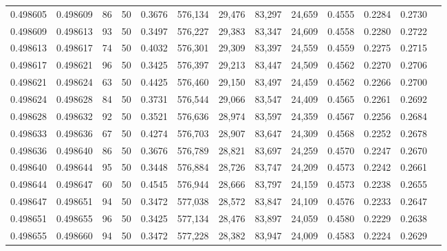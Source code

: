 \begin{tabular}{rrrrrrrrrrrrr}
0.498605 & 0.498609 &    86 &  50 &                                     0.3676 & 576,134 &  29,476 &  83,297 &  24,659 & 0.4555 & 0.2284 & 0.2730 \\
0.498609 & 0.498613 &    93 &  50 &                                     0.3497 & 576,227 &  29,383 &  83,347 &  24,609 & 0.4558 & 0.2280 & 0.2722 \\
0.498613 & 0.498617 &    74 &  50 &                                     0.4032 & 576,301 &  29,309 &  83,397 &  24,559 & 0.4559 & 0.2275 & 0.2715 \\
0.498617 & 0.498621 &    96 &  50 &                                     0.3425 & 576,397 &  29,213 &  83,447 &  24,509 & 0.4562 & 0.2270 & 0.2706 \\
0.498621 & 0.498624 &    63 &  50 &                                     0.4425 & 576,460 &  29,150 &  83,497 &  24,459 & 0.4562 & 0.2266 & 0.2700 \\
0.498624 & 0.498628 &    84 &  50 &                                     0.3731 & 576,544 &  29,066 &  83,547 &  24,409 & 0.4565 & 0.2261 & 0.2692 \\
0.498628 & 0.498632 &    92 &  50 &                                     0.3521 & 576,636 &  28,974 &  83,597 &  24,359 & 0.4567 & 0.2256 & 0.2684 \\
0.498633 & 0.498636 &    67 &  50 &                                     0.4274 & 576,703 &  28,907 &  83,647 &  24,309 & 0.4568 & 0.2252 & 0.2678 \\
0.498636 & 0.498640 &    86 &  50 &                                     0.3676 & 576,789 &  28,821 &  83,697 &  24,259 & 0.4570 & 0.2247 & 0.2670 \\
0.498640 & 0.498644 &    95 &  50 &                                     0.3448 & 576,884 &  28,726 &  83,747 &  24,209 & 0.4573 & 0.2242 & 0.2661 \\
0.498644 & 0.498647 &    60 &  50 &                                     0.4545 & 576,944 &  28,666 &  83,797 &  24,159 & 0.4573 & 0.2238 & 0.2655 \\
0.498647 & 0.498651 &    94 &  50 &                                     0.3472 & 577,038 &  28,572 &  83,847 &  24,109 & 0.4576 & 0.2233 & 0.2647 \\
0.498651 & 0.498655 &    96 &  50 &                                     0.3425 & 577,134 &  28,476 &  83,897 &  24,059 & 0.4580 & 0.2229 & 0.2638 \\
0.498655 & 0.498660 &    94 &  50 &                                     0.3472 & 577,228 &  28,382 &  83,947 &  24,009 & 0.4583 & 0.2224 & 0.2629 \\

\end{tabular}
